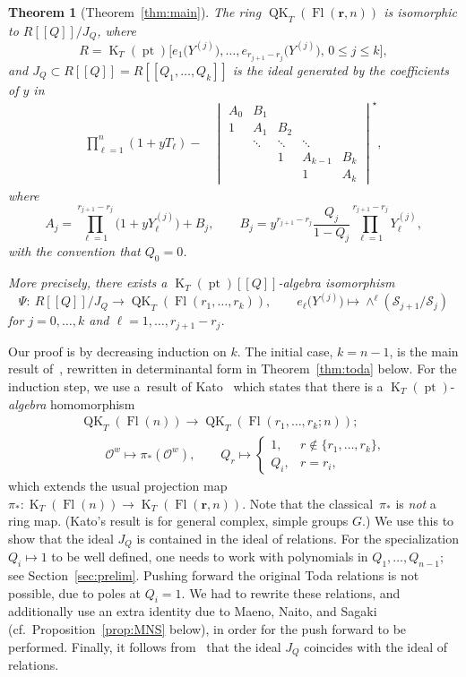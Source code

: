 \documentclass[pdftex]{sigma}
\numberwithin{equation}{section}
\newtheorem{Theorem}{Theorem}[section]
\theoremstyle{definition}
\newcommand{\dbb}[1]{[\![#1]\!]}
\DeclareMathOperator{\Fl}{Fl}
\DeclareMathOperator{\QK}{QK}
\DeclareMathOperator{\K}{K}
\DeclareMathOperator{\pt}{pt}
\newcommand{\bfr}{{\mathbf r}}
\newcommand{\cO}{{\mathcal O}}
\newcommand{\cS}{{\mathcal S}}
\begin{document}
\begin{Theorem}[Theorem~\ref{thm:main}]
 \label{thm:main-intro}
 The ring $\QK_T(\Fl(\bfr,n))$ is isomorphic to $R\dbb{Q}/J_Q$, where
 \[
 R=\K_T(\pt)\bigl[e_1\bigl(Y^{(j)}\bigr),\dots,e_{r_{j+1}-r_j}\bigl(Y^{(j)}\bigr),\, 0\leq j\leq k\bigr],
 \]
 and $J_Q\subset R[\![Q]\!]=R[\![Q_1,\dots,Q_k]\!]$
is the ideal generated by the coefficients of $y$ in
\begin{align*}
 \prod_{\ell=1}^{n}(1+yT_\ell)-
 &\begin{vmatrix}
 A_0 & B_1 & & & \\
 1 & A_1 & B_2 & & \\ & \ddots & \ddots & \ddots & \\ & & 1 & A_{k-1} & B_{k}\\ & & & 1 & A_{k}
 \end{vmatrix}^\star,
 \end{align*}
 where \[A_j=\prod_{\ell=1}^{r_{j+1}-r_j}\bigl(1+y Y^{(j)}_\ell\bigr)+B_j,\qquad B_j=y^{{r_{j+1}-r_j}}\frac{Q_j}{1-Q_j}\prod_{\ell=1}^{r_{j+1}-r_j}Y^{(j)}_\ell,\]
 with the convention that $Q_0=0$.

 More precisely,
there exists a $\K_T(\pt)[\![Q]\!]$-algebra isomorphism
\[\Psi\colon \ R[\![Q]\!]/J_Q \to \QK_T(\Fl(r_1,\dots,r_k)), \qquad e_\ell\bigl(Y^{(j)}\bigr) \mapsto \wedge^\ell (\cS_{j+1}/\cS_j) \]
for $j=0,\dots,k$ and $\ell=1,\dots,r_{j+1}-r_{j}$.
\end{Theorem}

Our proof is by decreasing induction on $k$. The initial case, $k=n-1$, is the main result of~\cite{maeno.naito.sagaki:QKideal}, rewritten in determinantal form in Theorem~\ref{thm:toda} below. For the induction step, we use a~result of Kato~\cite{kato2019quantum} which states that there is a
$\K_T(\pt)$-{\em algebra} homomorphism
\begin{gather}
\QK_T(\Fl(n)) \to \QK_T(\Fl(r_1, \dots , r_k;n)); \nonumber\\
\qquad{}\cO^w \mapsto \pi_*(\cO^w) ,
\qquad Q_r \mapsto \begin{cases} 1, & r \notin \{ r_1, \dots, r_k \}, \\
Q_i, & r=r_i ,\end{cases}\label{E:kato-push}
\end{gather}
which extends the usual projection map $\pi_*\colon \K_T(\Fl(n)) \to \K_T(\Fl(\bfr,n))$.
Note that the classical~$\pi_*$ is {\em not} a ring map. (Kato's result is for general complex, simple groups $G$.) We use this to show that the ideal $J_Q$ is contained in the ideal of relations.
For the specialization ${Q_i \mapsto 1}$ to be well defined, one needs to work with
polynomials in $Q_1, \dots, Q_{n-1}$; see Section~\ref{sec:prelim}.
Pushing forward the original Toda relations is not possible, due to poles at $Q_i=1$.
We had to rewrite these relations, and additionally
use an extra identity due to Maeno, Naito, and Sagaki
(cf.~Proposition~\ref{prop:MNS} below), in order for the push forward to be performed.
Finally, it follows from~\cite{GMSXZZ:Nakayama} that the ideal $J_Q$ coincides with the ideal of relations.
\end{document}
